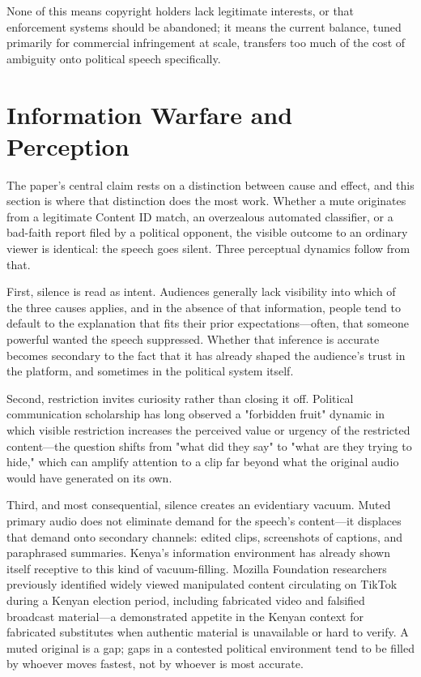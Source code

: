 \documentclass{article}
\begin{document}
None of this means copyright holders lack legitimate interests, or that enforcement systems should be abandoned; it means the current balance, tuned primarily for commercial infringement at scale, transfers too much of the cost of ambiguity onto political speech specifically.

\section{Information Warfare and Perception}

The paper's central claim rests on a distinction between cause and effect, and this section is where that distinction does the most work. Whether a mute originates from a legitimate Content ID match, an overzealous automated classifier, or a bad-faith report filed by a political opponent, the visible outcome to an ordinary viewer is identical: the speech goes silent. Three perceptual dynamics follow from that.

First, silence is read as intent. Audiences generally lack visibility into which of the three causes applies, and in the absence of that information, people tend to default to the explanation that fits their prior expectations—often, that someone powerful wanted the speech suppressed. Whether that inference is accurate becomes secondary to the fact that it has already shaped the audience's trust in the platform, and sometimes in the political system itself.

Second, restriction invites curiosity rather than closing it off. Political communication scholarship has long observed a "forbidden fruit" dynamic in which visible restriction increases the perceived value or urgency of the restricted content—the question shifts from "what did they say" to "what are they trying to hide," which can amplify attention to a clip far beyond what the original audio would have generated on its own.

Third, and most consequential, silence creates an evidentiary vacuum. Muted primary audio does not eliminate demand for the speech's content—it displaces that demand onto secondary channels: edited clips, screenshots of captions, and paraphrased summaries. Kenya's information environment has already shown itself receptive to this kind of vacuum-filling. Mozilla Foundation researchers previously identified widely viewed manipulated content circulating on TikTok during a Kenyan election period, including fabricated video and falsified broadcast material\cite{freedomhouse2024}—a demonstrated appetite in the Kenyan context for fabricated substitutes when authentic material is unavailable or hard to verify. A muted original is a gap; gaps in a contested political environment tend to be filled by whoever moves fastest, not by whoever is most accurate.
\end{document}
